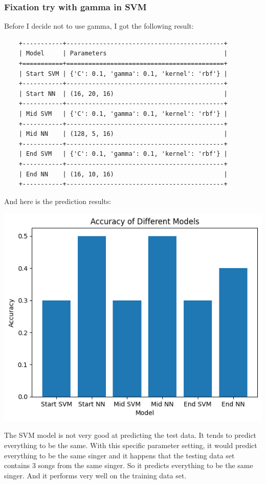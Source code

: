 \documentclass[letterpaper,12pt]{article}
\begin{document}
\subsubsection{Fixation try with gamma in SVM}
Before I decide not to use gamma, I got the following result:\begin{lstlisting}
    +-----------+-------------------------------------------+
    | Model     | Parameters                                |
    +===========+===========================================+
    | Start SVM | {'C': 0.1, 'gamma': 0.1, 'kernel': 'rbf'} |
    +-----------+-------------------------------------------+
    | Start NN  | (16, 20, 16)                              |
    +-----------+-------------------------------------------+
    | Mid SVM   | {'C': 0.1, 'gamma': 0.1, 'kernel': 'rbf'} |
    +-----------+-------------------------------------------+
    | Mid NN    | (128, 5, 16)                              |
    +-----------+-------------------------------------------+
    | End SVM   | {'C': 0.1, 'gamma': 0.1, 'kernel': 'rbf'} |
    +-----------+-------------------------------------------+
    | End NN    | (16, 10, 16)                              |
    +-----------+-------------------------------------------+
\end{lstlisting}
And here is the prediction results:

\includegraphics*[scale = 0.8]{./SVM fixation bar.png}

The SVM model is not very good at predicting the test data. It tends to predict everything to be the same. With this specific parameter setting, it would predict everything to be the same singer and it happens that the testing data set contains 3 songs from the same singer. So it predicts everything to be the same singer. And it performs very well on the training data set.
\end{document}
